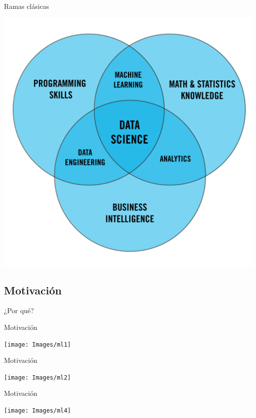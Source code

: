 \documentclass{beamer}
\begin{document}
\begin{frame}{Ramas clásicas}

\begin{center}
	\includegraphics[width=0.7\linewidth]{Images/data}
\end{center}

\end{frame}


\subsection{Motivación}
\begin{frame}
    \begin{center}
        \large ¿Por qué?
    \end{center}
\end{frame}
\begin{frame}{Motivación}
    \begin{center}
        \texttt{[image: Images/ml1]}
    \end{center}
\end{frame}

\begin{frame}{Motivación}
    \begin{center}
        \texttt{[image: Images/ml2]}
    \end{center}
\end{frame}

\begin{frame}{Motivación}
    \begin{center}
        \texttt{[image: Images/ml4]}
    \end{center}
\end{frame}
\end{document}

